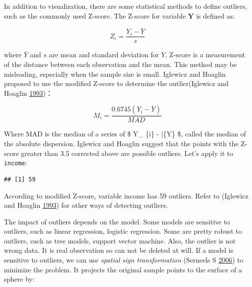 \documentclass[]{book}
\newenvironment{Shaded}{\begin{snugshade}}{\end{snugshade}}
\newcommand{\KeywordTok}[1]{\textcolor[rgb]{0.13,0.29,0.53}{\textbf{{#1}}}}
\newcommand{\FloatTok}[1]{\textcolor[rgb]{0.00,0.00,0.81}{{#1}}}
\newcommand{\CommentTok}[1]{\textcolor[rgb]{0.56,0.35,0.01}{\textit{{#1}}}}
\newcommand{\NormalTok}[1]{{#1}}
\theoremstyle{definition}
\theoremstyle{definition}
\theoremstyle{remark}
\begin{document}
In addition to visualization, there are some statistical methods to
define outliers, such as the commonly used Z-score. The Z-score for
variable \(\mathbf{Y}\) is defined as:

\[Z_{i}=\frac{Y_{i}-\bar{Y}}{s}\]

where \(\bar{Y}\) and \(s\) are mean and standard deviation for \(Y\).
Z-score is a measurement of the distance between each observation and
the mean. This method may be misleading, especially when the sample size
is small. Iglewicz and Hoaglin proposed to use the modified Z-score to
determine the outlier(Iglewicz and Hoaglin
\protect\hyperlink{ref-mad1}{1993})：

\[M_{i}=\frac{0.6745(Y_{i}-\bar{Y})}{MAD}\]

Where MAD is the median of a series of \$\textbar{} Y\_ \{i\} -
\bar\{Y\} \textbar{} \$, called the median of the absolute dispersion.
Iglewicz and Hoaglin suggest that the points with the Z-score greater
than 3.5 corrected above are possible outliers. Let's apply it to
\texttt{income}:

\begin{Shaded}
\end{Shaded}

\begin{verbatim}
## [1] 59
\end{verbatim}

According to modified Z-score, variable income has 59 outliers. Refer to
(Iglewicz and Hoaglin \protect\hyperlink{ref-mad1}{1993}) for other ways
of detecting outliers.

The impact of outliers depends on the model. Some models are sensitive
to outliers, such as linear regression, logistic regression. Some are
pretty robust to outliers, such as tree models, support vector machine.
Also, the outlier is not wrong data. It is real observation so can not
be deleted at will. If a model is sensitive to outliers, we can use
\emph{spatial sign transformation} (Serneels S
\protect\hyperlink{ref-ssp}{2006}) to minimize the problem. It projects
the original sample points to the surface of a sphere by:
\end{document}

